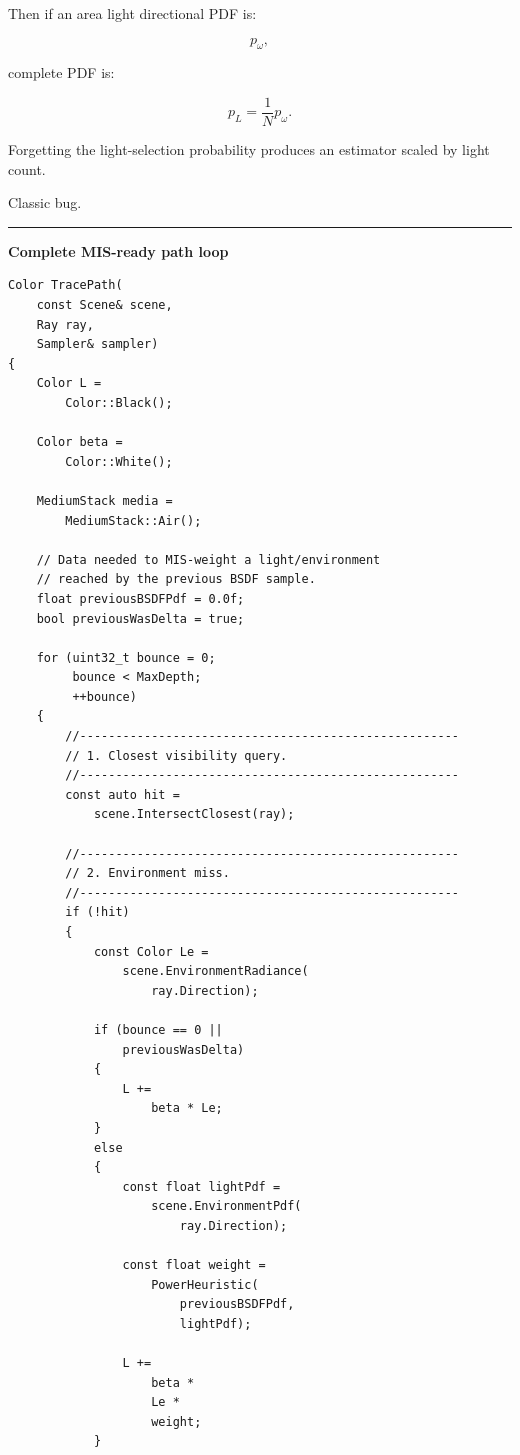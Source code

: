 Then if an area light directional PDF is:

\[
p_\omega,
\]

complete PDF is:

\[
\boxed{
p_L=
\frac1N p_\omega.
}
\]

Forgetting the light-selection probability produces an estimator scaled by light count.

Classic bug.

\begin{center}\rule{0.5\linewidth}{0.5pt}\end{center}

\textbf{Complete MIS-ready path loop}

\begin{verbatim}
Color TracePath(
    const Scene& scene,
    Ray ray,
    Sampler& sampler)
{
    Color L =
        Color::Black();

    Color beta =
        Color::White();

    MediumStack media =
        MediumStack::Air();

    // Data needed to MIS-weight a light/environment
    // reached by the previous BSDF sample.
    float previousBSDFPdf = 0.0f;
    bool previousWasDelta = true;

    for (uint32_t bounce = 0;
         bounce < MaxDepth;
         ++bounce)
    {
        //-----------------------------------------------------
        // 1. Closest visibility query.
        //-----------------------------------------------------
        const auto hit =
            scene.IntersectClosest(ray);

        //-----------------------------------------------------
        // 2. Environment miss.
        //-----------------------------------------------------
        if (!hit)
        {
            const Color Le =
                scene.EnvironmentRadiance(
                    ray.Direction);

            if (bounce == 0 ||
                previousWasDelta)
            {
                L +=
                    beta * Le;
            }
            else
            {
                const float lightPdf =
                    scene.EnvironmentPdf(
                        ray.Direction);

                const float weight =
                    PowerHeuristic(
                        previousBSDFPdf,
                        lightPdf);

                L +=
                    beta *
                    Le *
                    weight;
            }


\end{verbatim}
